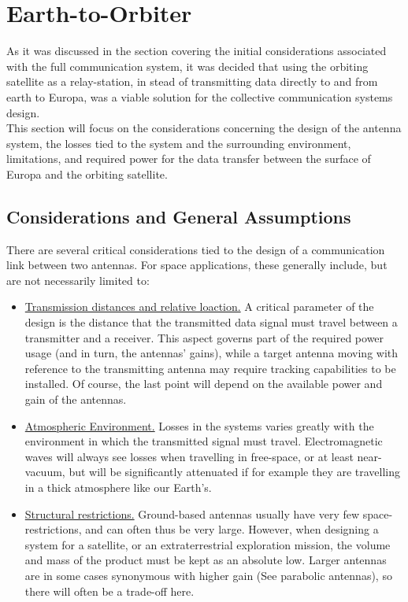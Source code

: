 \section{Earth-to-Orbiter}

As it was discussed in the section covering the initial considerations associated with the full communication system, it was decided that using the orbiting satellite as a relay-station, in stead of transmitting data directly to and from earth to Europa, was a viable solution for the collective communication systems design.\\
This section will focus on the considerations concerning the design of the antenna system, the losses tied to the system and the surrounding environment, limitations, and required power for the data transfer between the surface of Europa and the orbiting satellite.

\subsection{Considerations and General Assumptions}
There are several critical considerations tied to the design of a communication link between two antennas. For space applications, these generally include, but are not necessarily limited to:

\begin{itemize}
\item \underline{Transmission distances and relative loaction.} A critical parameter of the design is the distance that the transmitted data signal must travel between a transmitter and a receiver. This aspect governs part of the required power usage (and in turn, the antennas' gains), while a target antenna moving with reference to the transmitting antenna may require tracking capabilities to be installed. Of course, the last point will depend on the available power and gain of the antennas.
\item \underline{Atmospheric Environment.} Losses in the systems varies greatly with the environment in which the transmitted signal must travel. Electromagnetic waves will always see losses when travelling in free-space, or at least near-vacuum, but will be significantly attenuated if for example they are travelling in a thick atmosphere like our Earth's.
\item \underline{Structural restrictions.} Ground-based antennas usually have very few space-restrictions, and can often thus be very large. However, when designing a system for a satellite, or an extraterrestrial exploration mission, the volume and mass of the product must be kept as an absolute low. Larger antennas are in some cases synonymous with higher gain (See parabolic antennas), so there will often be a trade-off here.
\end{itemize}

